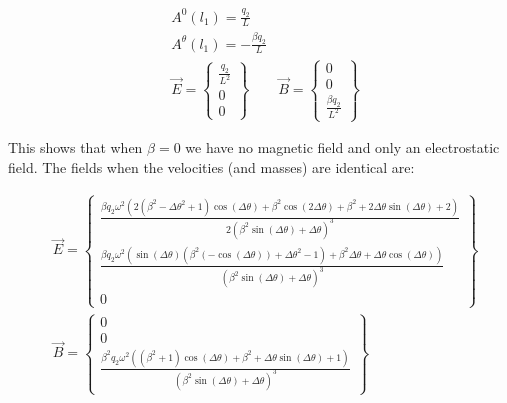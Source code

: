 \documentclass[11pt,a4paper]{article}
\begin{document}
\begin{subequations}
\label{eq:fieldsNonrelativistic}
\begin{align}
&A^{0}\left(l_{1}\right)=\frac{q_2}{L}\\
&A^{\theta}\left(l_{1}\right)=-\frac{\beta q_2}{L}\\
&\vec{E}=\left\{ \begin{array}{c}
\frac{q_2}{L^2}\\
0\\
0
\end{array}\right\}
&\vec{B}=\left\{ \begin{array}{c}
0\\
0\\
\frac{\beta q_2}{L^2}
\end{array}\right\}
\end{align}
\end{subequations}

This shows that when $\beta=0$ we have no magnetic field and only an electrostatic field. 
The fields when the velocities (and masses) are identical are:

\begin{subequations}
\begin{align}
&\vec{E}=\left\{ \begin{array}{c}
\frac{\beta  q_2 \omega ^2 \left(2 \left(\beta ^2-\Delta \theta ^2+1\right) \cos (\Delta \theta )+\beta ^2 \cos (2 \Delta \theta )+\beta ^2+2 \Delta \theta  \sin (\Delta \theta )+2\right)}{2 \left(\beta ^2 \sin (\Delta \theta )+\Delta \theta \right)^3}\\
\frac{\beta  q_2 \omega ^2 \left(\sin (\Delta \theta ) \left(\beta ^2 (-\cos (\Delta \theta ))+\Delta \theta ^2-1\right)+\beta ^2 \Delta \theta +\Delta \theta  \cos (\Delta \theta )\right)}{\left(\beta ^2 \sin (\Delta \theta )+\Delta \theta \right)^3}\\
0
\end{array}\right\}\\
&\vec{B}=\left\{ \begin{array}{c}
0\\
0\\
\frac{\beta ^2 q_2 \omega ^2 \left(\left(\beta ^2+1\right) \cos (\Delta \theta )+\beta ^2+\Delta \theta  \sin (\Delta \theta )+1\right)}{\left(\beta ^2 \sin (\Delta \theta )+\Delta \theta \right)^3}
\end{array}\right\}
\end{align}
\end{subequations}
\end{document}
